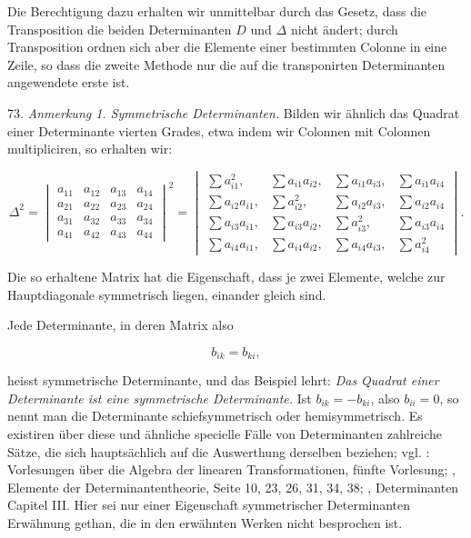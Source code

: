 Die Berechtigung dazu erhalten wir unmittelbar durch das Gesetz, dass die Transposition die beiden Determinanten $D$ und $\varDelta$ nicht ändert; durch Transposition ordnen sich aber die Elemente einer bestimmten Colonne in eine Zeile, so dass die zweite Methode nur die auf die transponirten Determinanten angewendete erste ist.

73. \textit{Anmerkung 1. Symmetrische Determinanten.} Bilden wir ähnlich das Quadrat einer Determinante vierten Grades, etwa indem wir Colonnen mit Colonnen multipliciren, so erhalten wir:

\[
\varDelta^2 =
\begin{vmatrix}
a_{11} & a_{12} & a_{13} & a_{14}\\
a_{21} & a_{22} & a_{23} & a_{24}\\
a_{31} & a_{32} & a_{33} & a_{34}\\
a_{41} & a_{42} & a_{43} & a_{44}
\end{vmatrix}^{2}
=
\begin{vmatrix}
\sum a_{i1}^{2}, & \sum a_{i1}a_{i2}, & \sum a_{i1}a_{i3}, & \sum a_{i1}a_{i4}\\
\sum a_{i2}a_{i1}, & \sum a_{i2}^{2}, & \sum a_{i2}a_{i3}, & \sum a_{i2}a_{i4}\\
\sum a_{i3}a_{i1}, & \sum a_{i3}a_{i2}, & \sum a_{i3}^{2}, & \sum a_{i3}a_{i4}\\
\sum a_{i4}a_{i1}, & \sum a_{i4}a_{i2}, & \sum a_{i4}a_{i3}, & \sum a_{i4}^{2}
\end{vmatrix}.
\]

Die so erhaltene Matrix hat die Eigenschaft, dass je zwei Elemente, welche zur Hauptdiagonale symmetrisch liegen, einander gleich sind.



Jede Determinante, in deren Matrix also

\[
b_{ik} = b_{ki},
\]

heisst symmetrische Determinante, und das Beispiel lehrt: \glqq{}\textit{Das Quadrat einer Determinante ist eine symmetrische Determinante.}\grqq{} Ist $b_{ik} = -b_{ki}$, also $b_{ii}=0$, so nennt man die Determinante schiefsymmetrisch oder hemisymmetrisch. Es existiren über diese und ähnliche specielle Fälle von Determinanten zahlreiche Sätze, die sich hauptsächlich auf die Auswerthung derselben beziehen; vgl. : Vorlesungen über die Algebra der linearen Transformationen, fünfte Vorlesung; , Elemente der Determinantentheorie, Seite 10, 23, 26, 31, 34, 38; , Determinanten Capitel III. Hier sei nur einer Eigenschaft symmetrischer Determinanten Erwähnung gethan, die in den erwähnten Werken nicht besprochen ist.


